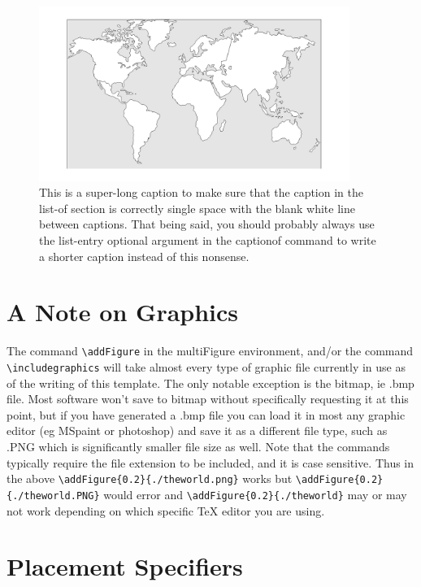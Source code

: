 \begin{figure}[h!]
    \begin{center}
        \includegraphics[width=0.9\textwidth]{graphics/theworld.png}
    \end{center}
     \caption[This is my shortened caption for my Table of Contents] {This is a super-long caption to make sure that the caption in the list-of section is correctly single space with the blank white line between captions. That being said, you should probably always use the list-entry optional argument in the captionof command to write a shorter caption instead of this nonsense.}
\end{figure}

\section{A Note on Graphics}
The command \verb|\addFigure| in the multiFigure environment, and/or the command \verb|\includegraphics| will take almost every type of graphic file currently in use as of the writing of this template. The only notable exception is the bitmap, ie .bmp file. Most software won't save to bitmap without specifically requesting it at this point, but if you have generated a .bmp file you can load it in most any graphic editor (eg MSpaint or photoshop) and save it as a different file type, such as .PNG which is significantly smaller file size as well. Note that the commands typically require the file extension to be included, and it is case sensitive. Thus in the above \verb|\addFigure{0.2}{./theworld.png}| works but \verb|\addFigure{0.2}{./theworld.PNG}| would error and \verb|\addFigure{0.2}{./theworld}| may or may not work depending on which specific TeX editor you are using.

\section{Placement Specifiers}

